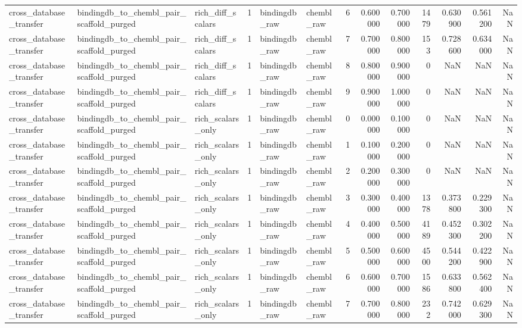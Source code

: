 \begin{longtable}{lllrllrrrrrrr}
cross\_database\_transfer & bindingdb\_to\_chembl\_pair\_scaffold\_purged & rich\_diff\_scalars & 1 & bindingdb\_raw & chembl\_raw & 6 & 0.600000 & 0.700000 & 1479 & 0.630900 & 0.561200 & NaN \\
cross\_database\_transfer & bindingdb\_to\_chembl\_pair\_scaffold\_purged & rich\_diff\_scalars & 1 & bindingdb\_raw & chembl\_raw & 7 & 0.700000 & 0.800000 & 153 & 0.728600 & 0.634000 & NaN \\
cross\_database\_transfer & bindingdb\_to\_chembl\_pair\_scaffold\_purged & rich\_diff\_scalars & 1 & bindingdb\_raw & chembl\_raw & 8 & 0.800000 & 0.900000 & 0 & NaN & NaN & NaN \\
cross\_database\_transfer & bindingdb\_to\_chembl\_pair\_scaffold\_purged & rich\_diff\_scalars & 1 & bindingdb\_raw & chembl\_raw & 9 & 0.900000 & 1.000000 & 0 & NaN & NaN & NaN \\
cross\_database\_transfer & bindingdb\_to\_chembl\_pair\_scaffold\_purged & rich\_scalars\_only & 1 & bindingdb\_raw & chembl\_raw & 0 & 0.000000 & 0.100000 & 0 & NaN & NaN & NaN \\
cross\_database\_transfer & bindingdb\_to\_chembl\_pair\_scaffold\_purged & rich\_scalars\_only & 1 & bindingdb\_raw & chembl\_raw & 1 & 0.100000 & 0.200000 & 0 & NaN & NaN & NaN \\
cross\_database\_transfer & bindingdb\_to\_chembl\_pair\_scaffold\_purged & rich\_scalars\_only & 1 & bindingdb\_raw & chembl\_raw & 2 & 0.200000 & 0.300000 & 0 & NaN & NaN & NaN \\
cross\_database\_transfer & bindingdb\_to\_chembl\_pair\_scaffold\_purged & rich\_scalars\_only & 1 & bindingdb\_raw & chembl\_raw & 3 & 0.300000 & 0.400000 & 1378 & 0.373800 & 0.229300 & NaN \\
cross\_database\_transfer & bindingdb\_to\_chembl\_pair\_scaffold\_purged & rich\_scalars\_only & 1 & bindingdb\_raw & chembl\_raw & 4 & 0.400000 & 0.500000 & 4189 & 0.452300 & 0.302200 & NaN \\
cross\_database\_transfer & bindingdb\_to\_chembl\_pair\_scaffold\_purged & rich\_scalars\_only & 1 & bindingdb\_raw & chembl\_raw & 5 & 0.500000 & 0.600000 & 4500 & 0.544200 & 0.422900 & NaN \\
cross\_database\_transfer & bindingdb\_to\_chembl\_pair\_scaffold\_purged & rich\_scalars\_only & 1 & bindingdb\_raw & chembl\_raw & 6 & 0.600000 & 0.700000 & 1586 & 0.633800 & 0.562400 & NaN \\
cross\_database\_transfer & bindingdb\_to\_chembl\_pair\_scaffold\_purged & rich\_scalars\_only & 1 & bindingdb\_raw & chembl\_raw & 7 & 0.700000 & 0.800000 & 232 & 0.742000 & 0.629300 & NaN \\

\end{longtable}
